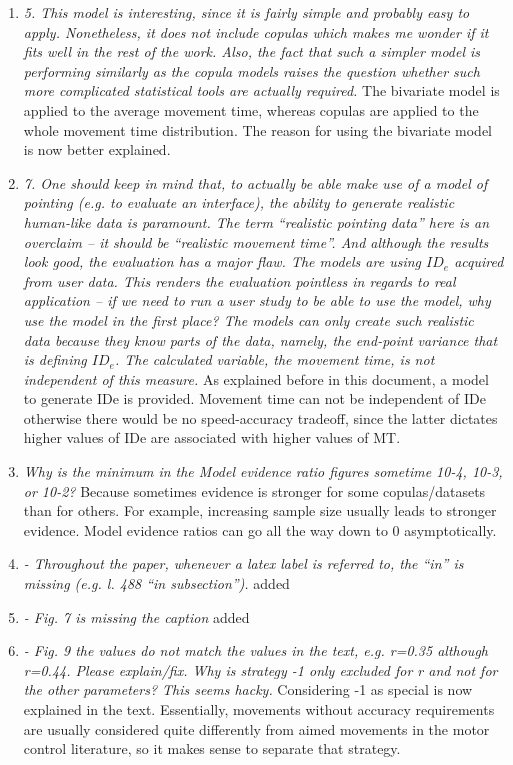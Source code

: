 \documentclass{article}
\begin{document}
\begin{enumerate}
    \item \textit{5. This model is interesting, since it is fairly simple and probably easy to apply. Nonetheless, it does not include copulas which makes me wonder if it fits well in the rest of the work. Also, the fact that such a simpler model is performing similarly as the copula models raises the question whether such more complicated statistical tools are actually required.} The bivariate model is applied to the average movement time, whereas copulas are applied to the whole movement time distribution. The reason for using the bivariate model is now better explained.
    \item \textit{7. One should keep in mind that, to actually be able make use of a model of pointing (e.g. to evaluate an interface), the ability to generate realistic human-like data is paramount. The term “realistic pointing data” here is an overclaim – it should be “realistic movement time”. And although the results look good, the evaluation has a major flaw. The models are using $ID_e$ acquired from user data. This renders the evaluation pointless in regards to real application -- if we need to run a user study to be able to use the model, why use the model in the first place? The models can only create such realistic data because they know parts of the data, namely, the end-point variance that is defining $ID_e$. The calculated variable, the movement time, is not independent of this measure. } As explained before in this document, a model to generate IDe is provided. Movement time can not be independent of IDe otherwise there would be no speed-accuracy tradeoff, since the latter dictates higher values of IDe are associated with higher values of MT.
    \item \textit{Why is the minimum in the Model evidence ratio figures sometime 10-4, 10-3, or 10-2? } Because sometimes evidence is stronger for some copulas/datasets than for others. For example, increasing sample size usually leads to stronger evidence. Model evidence ratios can go all the way down to $0$ asymptotically.
    \item \textit{-	Throughout the paper, whenever a latex label is referred to, the “in” is missing (e.g. l. 488 “in subsection”).} added
    \item \textit{-	Fig. 7 is missing the caption} added
    \item \textit{-	Fig. 9  the values do not match the values in the text, e.g. r=0.35 although r=0.44. Please explain/fix. Why is strategy -1 only excluded for r and not for the other parameters? This seems hacky.} Considering -1 as special is now explained in the text. Essentially, movements without accuracy requirements are usually considered quite differently from aimed movements in the motor control literature, so it makes sense to separate that strategy.

\end{enumerate}
\end{document}
